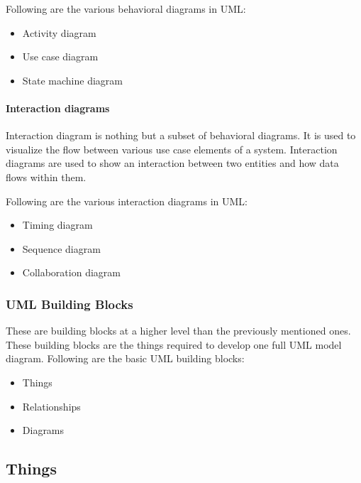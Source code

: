 \documentclass[
]{article}
\providecommand{\tightlist}{%
  \setlength{\itemsep}{0pt}\setlength{\parskip}{0pt}}
\begin{document}
Following are the various behavioral diagrams in UML:

\begin{itemize}
\tightlist
\item
  Activity diagram
\item
  Use case diagram
\item
  State machine diagram
\end{itemize}

\hypertarget{interaction-diagrams}{%
\paragraph{Interaction diagrams}\label{interaction-diagrams}}

Interaction diagram is nothing but a subset of behavioral diagrams. It
is used to visualize the flow between various use case elements of a
system. Interaction diagrams are used to show an interaction between two
entities and how data flows within them.

Following are the various interaction diagrams in UML:

\begin{itemize}
\tightlist
\item
  Timing diagram
\item
  Sequence diagram
\item
  Collaboration diagram
\end{itemize}

\hypertarget{uml-building-blocks}{%
\subsubsection{UML Building Blocks}\label{uml-building-blocks}}

These are building blocks at a higher level than the previously
mentioned ones. These building blocks are the things required to develop
one full UML model diagram. Following are the basic UML building blocks:

\begin{itemize}
\tightlist
\item
  Things
\item
  Relationships
\item
  Diagrams
\end{itemize}

\hypertarget{things}{%
\subsection{Things}\label{things}}
\end{document}
